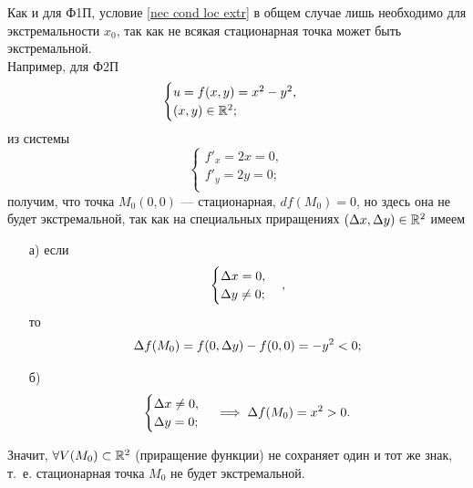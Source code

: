 \documentclass[../../main.tex]{subfiles}
\begin{document}
	\begin{rem}
		Как и для Ф1П, условие \eqref{nec cond loc extr} в общем случае
		лишь необходимо для экстремальности $x_0$, так как не всякая
		стационарная точка может быть экстремальной. \\
		Например, для Ф2П
		\[
		\begin{cases}
			u = f (x, y) = x^2 - y^2, \\
			(x, y) \in \mathbb{R}^2; \\
		\end{cases}
		\]
		из системы
		\[
		\begin{cases}
			f'_x = 2x = 0, \\
			f'_y = 2y = 0; \\
		\end{cases}
		\]
		получим, что точка $M_0 (0, 0)$ --- стационарная,
		$df (M_0) = 0$,
		но здесь она не будет экстремальной, так как на специальных приращениях
		$(\Delta x, \Delta y) \in \mathbb{R}^2$ имеем
		\begin{enumerate}
			\item[а)]
			если
			\[
			\begin{cases}
				\Delta x = 0, \\
				\Delta y \ne 0; \\
			\end{cases},
			\]
			то
			\[
				\Delta f (M_0)
				= f (0, \Delta y) - f (0, 0)
				= -y^2 < 0;
			\]
			
			\item[б)]
			\[
			\begin{cases}
				\Delta x \ne 0, \\
				\Delta y = 0; \\
			\end{cases}
			\implies
			\Delta f (M_0)
			= x^2 > 0.
			\]
		\end{enumerate}
		Значит, $\forall V (M_0) \subset \mathbb{R}^2$ (приращение функции)
		не сохраняет один и тот же знак, т.~е. стационарная точка $M_0$
		не будет экстремальной.
	\end{rem}
	
\end{document}
